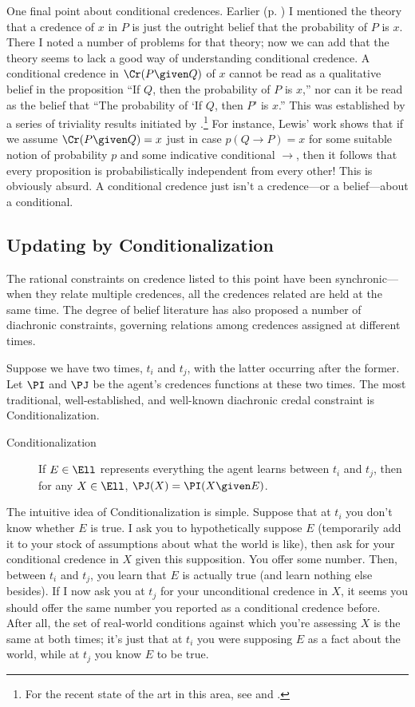 One final point about conditional credences. Earlier (p. \pageref{titelbaum-outright}) I mentioned the theory that a credence of $x$ in $P$ is just the outright belief that the probability of $P$ is $x$. There I noted a number of problems for that theory; now we can add that the theory seems to lack a good way of understanding conditional credence. A conditional credence in $\Cr(P \given Q)$ of $x$ cannot be read as a qualitative belief in the proposition ``If $Q$, then the probability of $P$ is $x$,'' nor can it be read as the belief that ``The probability of `If $Q$, then $P$' is $x$.'' This was established by a series of triviality results initiated by \citet{LewisProbCond}.\footnote
{For the recent state of the art in this area, see \citet{HajekTriviality} and \citet{FitelsonTriviality}.}
 For instance, Lewis' work shows that if we assume $\Cr(P \given Q)=x$ just in case $p(Q \rightarrow P)=x$ for some suitable notion of probability $p$ and some indicative conditional $\rightarrow$, then it follows that every proposition is probabilistically independent from every other! This is obviously absurd. A conditional credence just isn't a credence---or a belief---about a conditional. 

\subsection{Updating by Conditionalization} \label{ss:Cond}
The rational constraints on credence listed to this point have been synchronic---when they relate multiple credences, all the credences related are held at the same time. The degree of belief literature has also proposed a number of diachronic constraints, governing relations among credences assigned at different times.

Suppose we have two times, $t_i$ and $t_j$, with the latter occurring after the former. Let $\PI$ and $\PJ$ be the agent's credences functions at these two times. The most traditional, well-established, and well-known diachronic credal constraint is Conditionalization.
\begin{description}
\item[Conditionalization]{If $E \in \Ell$ represents everything the agent learns between $t_i$ and $t_j$, then for any $X \in \Ell$, $\PJ(X)=\PI(X \given E)$.}
\end{description}
The intuitive idea of Conditionalization is simple. Suppose that at $t_i$ you don't know whether $E$ is true. I ask you to hypothetically suppose $E$ (temporarily add it to your stock of assumptions about what the world is like), then ask for your conditional credence in $X$ given this supposition. You offer some number. Then, between $t_i$ and $t_j$, you learn that $E$ is actually true (and learn nothing else besides). If I now ask you at $t_j$ for your unconditional credence in $X$, it seems you should offer the same number you reported as a conditional credence before. After all, the set of real-world conditions against which you're assessing $X$ is the same at both times; it's just that at $t_i$ you were supposing $E$ as a fact about the world, while at $t_j$ you know $E$ to be true.

